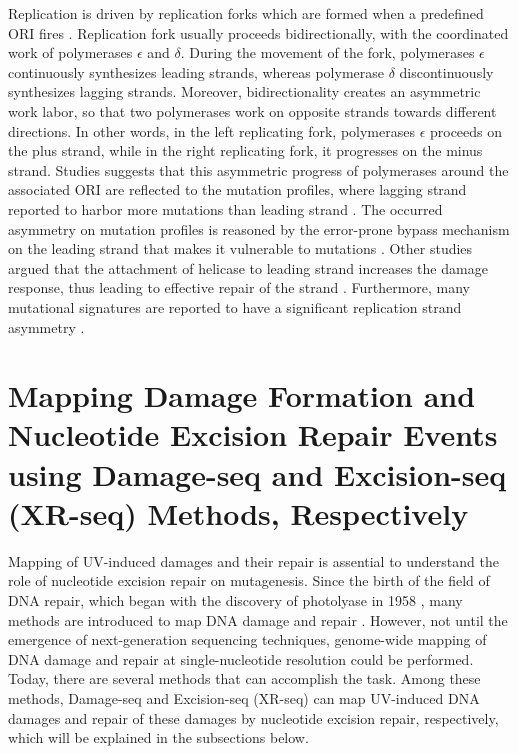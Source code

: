Replication is driven by replication forks which are formed when a predefined ORI fires \citep{langston2009whither}. Replication fork usually proceeds bidirectionally, with the coordinated work of polymerases $\epsilon$ and $\delta$. During the movement of the fork, polymerases $\epsilon$ continuously synthesizes leading strands, whereas polymerase $\delta$ discontinuously synthesizes lagging strands. Moreover, bidirectionality creates an asymmetric work labor, so that two polymerases work on opposite strands towards different directions. In other words, in the left replicating fork, polymerases $\epsilon$ proceeds on the plus strand, while in the right replicating fork, it progresses on the minus strand. Studies suggests that this asymmetric progress of polymerases around the associated ORI are reflected to the mutation profiles, where lagging strand reported to harbor more mutations than leading strand \citep{haradhvala2016mutational,lujan2012mismatch,reijns2015lagging,shinbrot2014exonuclease}. The occurred asymmetry on mutation profiles is reasoned by the error-prone bypass mechanism on the leading strand that makes it vulnerable to mutations \citep{seplyarskiy2019error}. Other studies argued that the attachment of helicase to leading strand increases the damage response, thus leading to effective repair of the strand \citep{hedglin2017eukaryotic,yeeles2013rescuing}. Furthermore, many mutational signatures are reported to have a significant replication strand asymmetry \citep{tomkova2018mutational}.

\section{Mapping Damage Formation and Nucleotide Excision Repair Events using Damage-seq and Excision-seq (XR-seq) Methods, Respectively}

Mapping of UV-induced damages and their repair is assential to understand the role of nucleotide excision repair on mutagenesis. Since the birth of the field of DNA repair, which began with the discovery of photolyase in 1958 \citep{rupert1958photoreactivation,sancar2016mechanisms}, many methods are introduced to map DNA damage and repair \citep{li2020methodologies}. However, not until the emergence of next-generation sequencing techniques, genome-wide mapping of DNA damage and repair at single-nucleotide resolution could be performed. Today, there are several methods that can accomplish the task. Among these methods, Damage-seq and Excision-seq (XR-seq) can map UV-induced DNA damages and repair of these damages by nucleotide excision repair, respectively, which will be explained in the subsections below.

